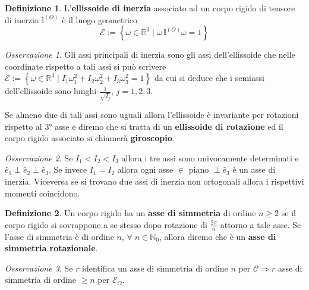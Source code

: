 \documentclass{book}
\theoremstyle{plain}
\theoremstyle{plain}
\theoremstyle{plain}
\theoremstyle{plain}
\theoremstyle{plain}
\theoremstyle{definition}
\newtheorem{defi}{Definizione}[chapter]
\theoremstyle{remark}
\newtheorem*{oss}{Osservazione}
\theoremstyle{definition}
\begin{document}
\begin{defi}
    L'\textbf{ellissoide di inerzia} associato ad un corpo rigido di tensore di inerzia $\mathbb{I}^{(O)}$ è il luogo geometrico
    \begin{displaymath}
        \mathcal{E}:=\left\{\overline{\omega} \in \mathbb{R}^3\;|\; \overline{\omega}\,\mathbb{I}^{(O)}\overline{\omega} =1\right\}
    \end{displaymath}
\end{defi}

\begin{oss}
    Gli assi principali di inerzia sono gli assi dell'ellissoide che nelle coordinate rispetto a tali assi si può scrivere $\mathcal{E}:=\left\{\overline{\omega} \in \mathbb{R}^3\;|\;I_1\omega_1^2 + I_2\omega_2^2 + I_3\omega_3^2 =1\right\}$ da cui si deduce che i semiassi dell'ellissoide sono lunghi $\frac{1}{\sqrt{I_j}}$, $j=1, 2, 3$.
    
    \noindent Se almeno due di tali assi sono uguali allora l'ellissoide è invariante per rotazioni rispetto al 3° asse e diremo che si tratta di un \textbf{ellissoide di rotazione} ed il corpo rigido associato si chiamerà \textbf{giroscopio}.
\end{oss}

\begin{oss}
     Se $I_1<I_2<I_3$ allora i tre assi sono univocamente determinati e $\hat{e}_1 \perp \hat{e}_2 \perp \hat{e}_3$.
     Se invece $I_1=I_2$ allora ogni asse $\in$ piano $\perp \hat{e}_3$ è un asse di inerzia. Viceversa se si trovano due assi di inerzia non ortogonali allora i rispettivi momenti coincidono.
\end{oss}

\begin{defi}
    Un corpo rigido ha un \textbf{asse di simmetria} di ordine $ n\ge2$ se il corpo rigido si sovrappone a se stesso dopo rotazione di $\frac{2\pi}{n}$ attorno a tale asse. Se l'asse di simmetria è di ordine $n$, $\forall \;n\in\mathbb{N}_0$, allora diremo che è un \textbf{asse di simmetria rotazionale}.
\end{defi}

\begin{oss}
    Se $r$ identifica un asse di simmetria di ordine $n$ per $\mathcal{C} \Longrightarrow r$ asse di simmetria di ordine $\ge n$ per $\mathcal{E}_O$. 
\end{oss}
\end{document}
